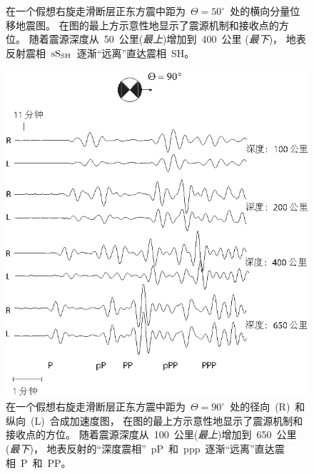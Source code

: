 \begin{figure}[!t]
\begin{center}
\end{center}
\caption[seismogram3]{
\label{fig:10.14}
在一个假想右旋走滑断层正东方震中距为~$\Theta=50^\circ$~处的横向分量位移地震图。
在图的最上方示意性地显示了震源机制和接收点的方位。
随着震源深度从~50~公里({\em 最上\/})增加到~400~公里 ({\em 最下\/})，
地表反射震相~${\rm sS}_{\rm SH}$~逐渐“远离”直达震相~SH。}
\end{figure}
\begin{figure}[!t]
\begin{center}
\includegraphics{../figures/chap10/fig13.eps}
\end{center}
\caption[seismogram4]{
\label{fig:10.15}
在一个假想右旋走滑断层正东方震中距为~$\Theta=90^\circ$~处的径向~(R)~和纵向~(L)~合成加速度图，
在图的最上方示意性地显示了震源机制和接收点的方位。
随着震源深度从~100~公里({\em 最上\/})增加到~650~公里 ({\em 最下\/})，
地表反射的“深度震相”~pP~和~ppp~逐渐“远离”直达震相~P~和~PP。}
\end{figure}

